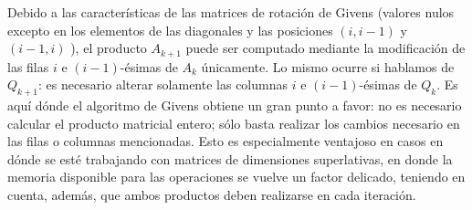 \documentclass[journal, monochrome]{IEEEtran}
\begin{document}
\par
Debido a las características de las matrices de rotación de Givens (valores nulos excepto en los elementos de las diagonales y las posiciones $(i, i-1)$ y $(i-1,i)$ ),
el producto $A_{k+1}$ puede ser computado mediante la modificación de las filas $i$ e $(i-1)$-ésimas de $A_k$ únicamente. Lo mismo ocurre si hablamos de $Q_{k+1}$: es necesario alterar
solamente las columnas $i$ e $(i-1)$-ésimas de $Q_{k}$. Es aquí dónde el algoritmo de Givens obtiene un gran punto a favor: no es necesario
calcular el producto matricial entero; sólo basta realizar los cambios necesario en las filas o columnas mencionadas. Esto es especialmente ventajoso
en casos en dónde se esté trabajando con matrices de dimensiones superlativas, en donde la memoria disponible para las operaciones se vuelve un factor delicado, teniendo
en cuenta, además, que ambos productos deben realizarse en cada iteración.



\begin{figure}
	
\end{figure}

\begin{figure}
	
\end{figure}

\begin{figure}
	
\end{figure}

\begin{figure}
	
\end{figure}
\begin{figure}
	
\end{figure}




\end{document}
